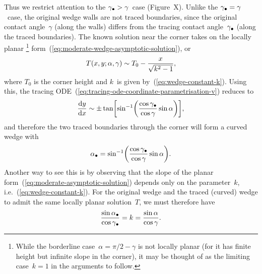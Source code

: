 Thus we restrict attention to the $\gamma_\bullet > \gamma$~case
(Figure~X). %
Unlike the $\gamma_\bullet = \gamma$~case,
the original wedge walls are not traced boundaries,
since the original contact angle~$\gamma$
(along the walls)
differs from the tracing contact angle~$\gamma_\bullet$
(along the traced boundaries).
The known solution near the corner takes on
the locally planar%
\footnote{
  While the borderline case~$\alpha = \pi/2 - \gamma$ is not locally planar
  (for it has finite height but infinite slope in the corner),
  it may be thought of as the limiting case~$k = 1$
  in the arguments to follow.
}
form~(\ref{eq:moderate-wedge-asymptotic-solution}),
or
\begin{equation}
  T (x, y; \alpha, \gamma) \sim T_0 - \frac{x}{\sqrt{k^2 - 1}},
  \label{eq:moderate-asymptotic-solution}
\end{equation}
where $T_0$ is the corner height
and $k$~is given by~(\ref{eq:wedge-constant-k}).
Using this,
the tracing ODE~(\ref{eq:tracing-ode-coordinate-parametrisation-v})
reduces to
\begin{equation}
  \tder{y}{x} \asy
    \pm \tan\squarebr*{
      \sin^{-1}\roundbr*{
        \frac{\cos\tr{\gamma}}{\cos\gamma} \sin\alpha
      }
    },
  \label{eq:moderate-asymptotic-tracing-ode-different-angle}
\end{equation}
and therefore the two traced boundaries through the corner
will form a curved wedge with 
\begin{equation}
  \tr{\alpha} =
    \sin^{-1}\roundbr*{
      \frac{\cos\tr{\gamma}}{\cos\gamma} \sin\alpha
    }.
  \label{eq:moderate-reduced-half-angle}
\end{equation}
Another way to see this is by observing that
the slope of the planar form~(\ref{eq:moderate-asymptotic-solution})
depends only on the parameter~$k$, i.e.~(\ref{eq:wedge-constant-k}).
For the original wedge and the traced (curved) wedge
to admit the same locally planar solution~$T$,
we must therefore have
\begin{equation}
  \frac{\sin\alpha_\bullet}{\cos\gamma_\bullet} = k = \frac{\sin\alpha}{\cos\gamma}.
  \label{eq:moderate-constant-k-different-angle}
\end{equation}

